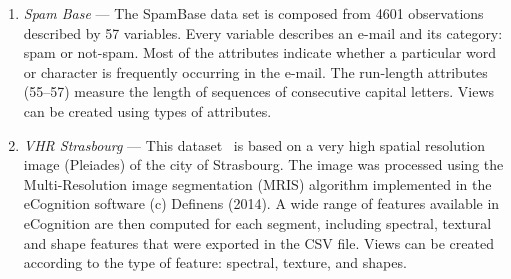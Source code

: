 \begin{enumerate}
	\item \textit{Spam Base} --- The SpamBase data set is composed from 4601 observations described by 57 variables. Every variable describes an e-mail and its category: spam or not-spam. Most of the attributes indicate whether a particular word or character is frequently occurring in the e-mail. The run-length attributes (55--57) measure the length of sequences of consecutive capital letters. Views can be created using types of attributes.\\
	\item \textit{VHR Strasbourg} --- This dataset~\cite{THRData} is based on a very high spatial resolution image (Pleiades) of the city of Strasbourg. The image was processed using the Multi-Resolution image segmentation (MRIS) algorithm implemented in the eCognition software (c) Definens (2014). A wide range of features available in eCognition are then computed for each segment, including spectral, textural and shape features that were exported in the CSV file. Views can be created according to the type of feature: spectral, texture, and shapes.
	\end{enumerate}


